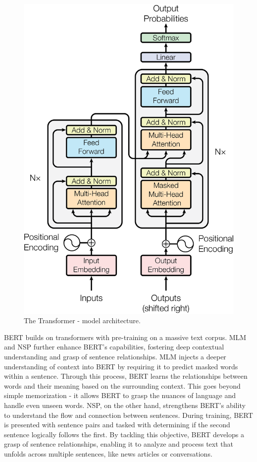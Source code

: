 \begin{figure}[h]
 \centering
 \includegraphics[scale=0.6]{src/fig/imgs/transformer_arch.png}
 \caption{The Transformer - model architecture.}
    \label{fig:model-arch}
\end{figure}

\ac{BERT} \cite{devlin2019bert} builds on transformers with pre-training on a massive text corpus.
\ac{MLM} and \ac{NSP} further enhance \ac{BERT}'s capabilities, fostering deep contextual understanding and grasp of sentence relationships.
\ac{MLM} injects a deeper understanding of context into \ac{BERT} by requiring it to predict masked words within a sentence.
Through this process, \ac{BERT} learns the relationships between words and their meaning based on the surrounding context.
This goes beyond simple memorization - it allows \ac{BERT} to grasp the nuances of language and handle even unseen words.
\ac{NSP}, on the other hand, strengthens \ac{BERT}'s ability to understand the flow and connection between sentences.
During training, \ac{BERT} is presented with sentence pairs and tasked with determining if the second sentence logically follows the first. 
By tackling this objective, \ac{BERT} develops a grasp of sentence relationships, enabling it to analyze and process text that unfolds across multiple sentences, like news articles or conversations.

